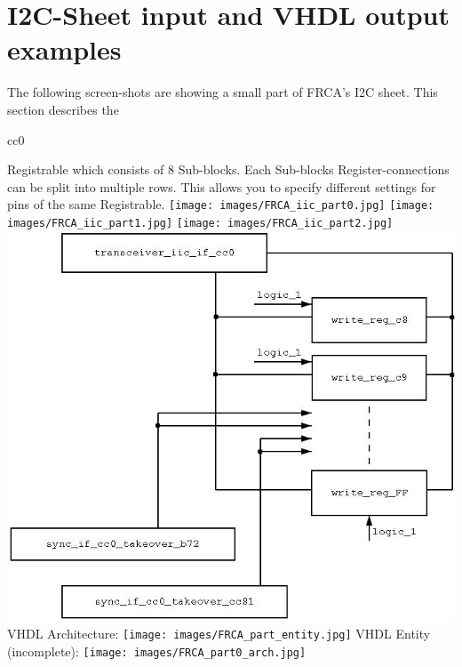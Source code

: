 \documentclass[a4paper,12pt]{report}
\begin{document}
\section{I2C-Sheet input and VHDL output examples}
The following screen-shots are showing a small part of  FRCA's I2C sheet. This section describes the \begin{tt}cc0\end{tt} Registrable which consists of 8 Sub-blocks. Each Sub-blocks Register-connections can be split into multiple rows. This allows you to specify different settings for pins of the same Registrable.\newline
\newline
\texttt{[image: images/FRCA\_iic\_part0.jpg]}\newline
\newline
\texttt{[image: images/FRCA\_iic\_part1.jpg]}\newline
\newline
\texttt{[image: images/FRCA\_iic\_part2.jpg]}\newline
\newline
\includegraphics[scale=0.6]{images/FRCA_iic_block.jpg}\newline
\newpage
VHDL Architecture:\newline
\texttt{[image: images/FRCA\_part\_entity.jpg]}\newline
\newpage
VHDL Entity (incomplete):\newline
\texttt{[image: images/FRCA\_part0\_arch.jpg]}\newline
\end{document}
